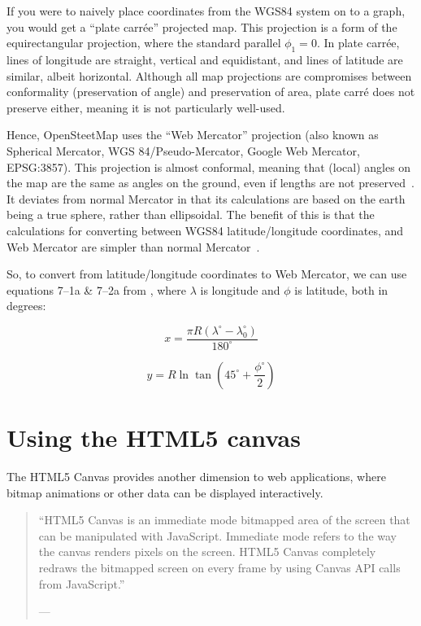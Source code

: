 \documentclass[]{final_report}
\begin{document}
If you were to naively place coordinates from the WGS84 system on to a graph, you would get a ``plate carrée'' projected map. This projection is a form of the equirectangular projection, where the standard parallel \(\phi_1 = 0\). In plate carrée, lines of longitude are straight, vertical and equidistant, and lines of latitude are similar, albeit horizontal. Although all map projections are compromises between conformality (preservation of angle) and preservation of area, plate carré does not preserve either, meaning it is not particularly well-used.

Hence, OpenSteetMap uses the ``Web Mercator'' projection (also known as Spherical Mercator, WGS 84/Pseudo-Mercator, Google Web Mercator, EPSG:3857). This projection is almost conformal, meaning that (local) angles on the map are the same as angles on the ground, even if lengths are not preserved~\cite{carto-implications-of-webmercator,}. It deviates from normal Mercator in that its calculations are based on the earth being a true sphere, rather than ellipsoidal. The benefit of this is that the calculations for converting between WGS84 latitude/longitude coordinates, and Web Mercator are simpler than normal Mercator~\cite{ugrc-earth-not-round}.

So, to convert from latitude/longitude coordinates to Web Mercator, we can use equations 7--1a \& 7--2a from \textcite[41]{snyder1987map}, where \(\lambda{}\) is longitude and \(\phi{}\) is latitude, both in degrees:

\[x = \frac{\pi R(\lambda^\circ - \lambda^\circ_0)}{180^\circ} \]

\[y = R \ln \tan \left( 45^\circ + \frac{\phi^\circ}{2} \right) \]

\chapter{Using the HTML5 canvas}

The HTML5 Canvas provides another dimension to web applications, where bitmap animations or other data can be displayed interactively.

\begin{quote}
    ``HTML5 Canvas is an immediate mode bitmapped area of the screen that can be manipulated with JavaScript. Immediate mode refers to the way the canvas renders pixels on the screen. HTML5 Canvas completely redraws the bitmapped screen on every frame by using Canvas API calls from JavaScript.''

    \footnotesize{--- }
\end{quote}
\end{document}
